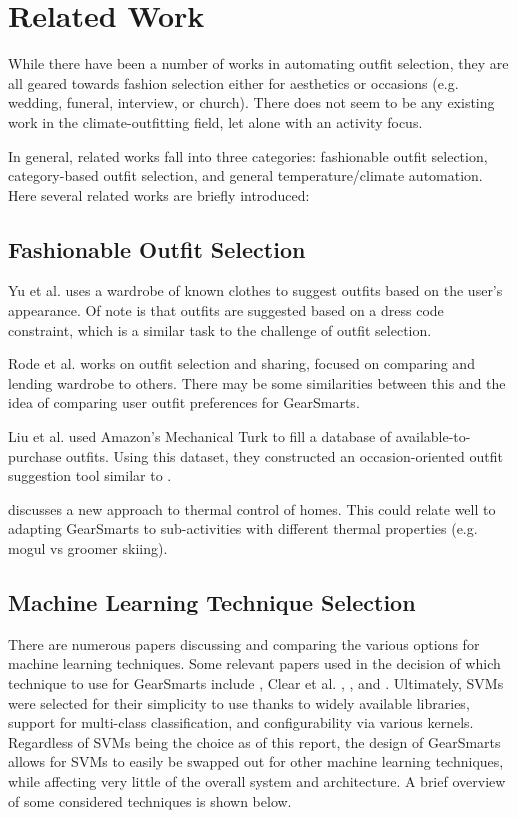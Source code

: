 \section{Related Work}
\label{section:relatedwork}
While there have been a number of works in automating outfit selection, they are all geared towards
fashion selection either for aesthetics or occasions (e.g. wedding, funeral, interview, or church).
There does not seem to be any existing work in the climate-outfitting field, let alone with an
activity focus.

In general, related works fall into three categories: fashionable outfit selection, category-based
outfit selection, and general temperature/climate automation. Here several related works are briefly introduced:

\subsection{Fashionable Outfit Selection}
Yu et al. \cite{Dressup} uses a wardrobe of known clothes to suggest outfits based on the user's appearance.
Of note is that outfits are suggested based on a dress code constraint, which is a similar task to
the challenge of outfit selection.

Rode et al. \cite{SmartCloset} works on outfit selection and sharing, focused on comparing and lending wardrobe
to others. There may be some similarities between this and the idea of comparing user outfit preferences
for GearSmarts.

Liu et al. \cite{MagicCloset} used Amazon's Mechanical Turk to fill a database of available-to-purchase outfits.
Using this dataset, they constructed an occasion-oriented outfit suggestion tool similar to \cite{Dressup}.

\cite{ThermalComfort} discusses a new approach to thermal control of homes. This could relate well to
adapting GearSmarts to sub-activities with different thermal properties (e.g. mogul vs groomer skiing).

\subsection{Machine Learning Technique Selection}
There are numerous papers discussing and comparing the various options for machine learning techniques.
Some relevant papers used in the decision of which technique to use for GearSmarts include \cite{ML:MapReduceClusters},
Clear et al. \cite{ML:ManufacturingSystems}, \cite{ML:IPTraffic}, and \cite{ML:GeoMapping}. Ultimately, SVMs were selected
for their simplicity to use thanks to widely available libraries, support for multi-class classification, and configurability
via various kernels. Regardless of SVMs being the choice as of this report, the design of GearSmarts allows for SVMs
to easily be swapped out for other machine learning techniques, while affecting very little of the overall system and
architecture. A brief overview of some considered techniques is shown below.

